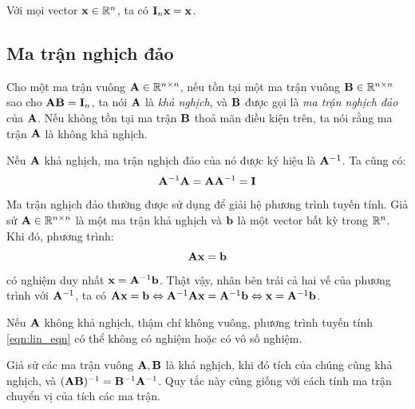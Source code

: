 Với mọi vector $\mathbf{x} \in \mathbb{R}^n$, ta có $\mathbf{I}_n \mathbf{x} = \mathbf{x}$.



\subsection{Ma trận nghịch đảo} %
\label{sub:inverse_matrix}

Cho một ma trận vuông $\mathbf{A} \in \mathbb{R}^{n\times n }$, nếu tồn tại một ma trận vuông
$\mathbf{B} \in \mathbb{R}^{n\times n}$ sao cho $\mathbf{A}\mathbf{B} = \mathbf{I}_n$, ta nói $\mathbf{A}$ là \textit{khả
nghịch}, và $\mathbf{B}$ được gọi là \textit{ma trận nghịch đảo} của $\mathbf{A}$. Nếu không
tồn tại ma trận $\mathbf{B}$ thoả mãn điều kiện trên, ta nói rằng ma trận $\mathbf{A}$ là
{không khả nghịch}.

Nếu $\mathbf{A}$ khả nghịch, ma trận nghịch đảo của nó được ký hiệu là $\mathbf{A}^{-1}$. Ta
cũng có:
\begin{equation}
\mathbf{A}^{-1}\mathbf{A} = \mathbf{A}\mathbf{A}^{-1} = \mathbf{I}
\end{equation}
Ma trận nghịch đảo thường được sử dụng để giải hệ phương trình tuyến tính. Giả
sử $\mathbf{A} \in \mathbb{R}^{n\times n}$ là một ma trận khả nghịch và $\mathbf{b}$ là một vector bất kỳ trong $\mathbb{R}^n$. Khi đó, phương trình:
\begin{equation}
\label{eqn:lin_eqn}
\mathbf{A}\mathbf{x} = \mathbf{b}
\end{equation}
có nghiệm duy nhất $\mathbf{x} = \mathbf{A}^{-1}\mathbf{b}$. Thật vậy, nhân bên trái cả hai vế của
phương trình với $\mathbf{A}^{-1}$, ta có $\mathbf{A}\mathbf{x} = \mathbf{b} \Leftrightarrow  \mathbf{A}^{-1}\mathbf{A}\mathbf{x} = \mathbf{A}^{-1}\mathbf{b} \Leftrightarrow \mathbf{x} = \mathbf{A}^{-1}\mathbf{b}$.

Nếu $\mathbf{A}$ không khả nghịch, thậm chí không vuông, phương trình tuyến tính
\eqref{eqn:lin_eqn} có thể không có nghiệm hoặc có vô số nghiệm.

Giả sử các ma trận vuông $\mathbf{A}, \mathbf{B}$ là khả nghịch, khi đó tích của chúng cũng
khả nghịch, và $(\mathbf{A}\mathbf{B})^{-1} = \mathbf{B}^{-1}\mathbf{A}^{-1}$. Quy tắc này cũng giống
với cách tính ma trận chuyển vị của tích các ma trận.


